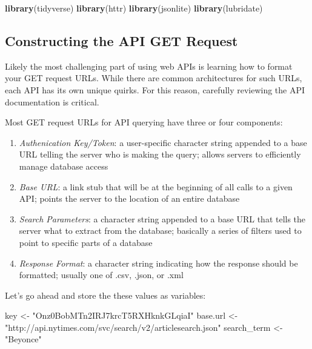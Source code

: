 \documentclass[]{book}
\newenvironment{Shaded}{\begin{snugshade}}{\end{snugshade}}
\newcommand{\KeywordTok}[1]{\textcolor[rgb]{0.13,0.29,0.53}{\textbf{#1}}}
\newcommand{\StringTok}[1]{\textcolor[rgb]{0.31,0.60,0.02}{#1}}
\newcommand{\NormalTok}[1]{#1}
\begin{document}
\begin{Shaded}
\begin{Highlighting}[]
\KeywordTok{library}\NormalTok{(tidyverse)}
\KeywordTok{library}\NormalTok{(httr)}
\KeywordTok{library}\NormalTok{(jsonlite)}
\KeywordTok{library}\NormalTok{(lubridate)}
\end{Highlighting}
\end{Shaded}

\subsection{Constructing the API GET
Request}\label{constructing-the-api-get-request}

Likely the most challenging part of using web APIs is learning how to
format your GET request URLs. While there are common architectures for
such URLs, each API has its own unique quirks. For this reason,
carefully reviewing the API documentation is critical.

Most GET request URLs for API querying have three or four components:

\begin{enumerate}
\def\labelenumi{\arabic{enumi}.}
\item
  \emph{Authenication Key/Token}: a user-specific character string
  appended to a base URL telling the server who is making the query;
  allows servers to efficiently manage database access
\item
  \emph{Base URL}: a link stub that will be at the beginning of all
  calls to a given API; points the server to the location of an entire
  database
\item
  \emph{Search Parameters}: a character string appended to a base URL
  that tells the server what to extract from the database; basically a
  series of filters used to point to specific parts of a database
\item
  \emph{Response Format}: a character string indicating how the response
  should be formatted; usually one of .csv, .json, or .xml
\end{enumerate}

Let's go ahead and store the these values as variables:

\begin{Shaded}
\begin{Highlighting}[]
\NormalTok{key <-}\StringTok{ "Onz0BobMTn2IRJ7krcT5RXHknkGLqiaI"}
\NormalTok{base.url <-}\StringTok{ "http://api.nytimes.com/svc/search/v2/articlesearch.json"}
\NormalTok{search_term <-}\StringTok{ "Beyonce"}
\end{Highlighting}
\end{Shaded}
\end{document}
